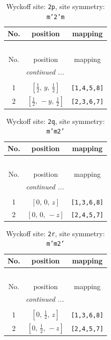 \documentclass[fleqn,8pt]{jsarticle}
\begin{document}
\begin{longtable}{ccc}
\caption{Wyckoff site: {\tt 2p}, site symmetry: {\tt m'2'm}}
 \\
 \hline \hline
No. & position & mapping \\ \hline \endfirsthead

\multicolumn{2}{l}{\tablename\ \thetable{}} \\
 \hline \hline
No. & position & mapping \\ \hline \endhead

 \hline \hline
\multicolumn{2}{r}{\footnotesize\it continued ...} \\ \endfoot

 \hline \hline
\multicolumn{2}{r}{} \\ \endlastfoot

1 & $\left[ \frac{1}{2},\, y,\, \frac{1}{2} \right]$ & {\tt [1,4,5,8]} \\ \hline
2 & $\left[ \frac{1}{2},\, - y,\, \frac{1}{2} \right]$ & {\tt [2,3,6,7]} \\
\end{longtable}
\renewcommand{\arraystretch}{1.2}
\begin{longtable}{ccc}
\caption{Wyckoff site: {\tt 2q}, site symmetry: {\tt m'm2'}}
 \\
 \hline \hline
No. & position & mapping \\ \hline \endfirsthead

\multicolumn{2}{l}{\tablename\ \thetable{}} \\
 \hline \hline
No. & position & mapping \\ \hline \endhead

 \hline \hline
\multicolumn{2}{r}{\footnotesize\it continued ...} \\ \endfoot

 \hline \hline
\multicolumn{2}{r}{} \\ \endlastfoot

1 & $\left[ 0,\, 0,\, z \right]$ & {\tt [1,3,6,8]} \\ \hline
2 & $\left[ 0,\, 0,\, - z \right]$ & {\tt [2,4,5,7]} \\
\end{longtable}
\renewcommand{\arraystretch}{1.2}
\begin{longtable}{ccc}
\caption{Wyckoff site: {\tt 2r}, site symmetry: {\tt m'm2'}}
 \\
 \hline \hline
No. & position & mapping \\ \hline \endfirsthead

\multicolumn{2}{l}{\tablename\ \thetable{}} \\
 \hline \hline
No. & position & mapping \\ \hline \endhead

 \hline \hline
\multicolumn{2}{r}{\footnotesize\it continued ...} \\ \endfoot

 \hline \hline
\multicolumn{2}{r}{} \\ \endlastfoot

1 & $\left[ 0,\, \frac{1}{2},\, z \right]$ & {\tt [1,3,6,8]} \\ \hline
2 & $\left[ 0,\, \frac{1}{2},\, - z \right]$ & {\tt [2,4,5,7]} \\
\end{longtable}
\end{document}
